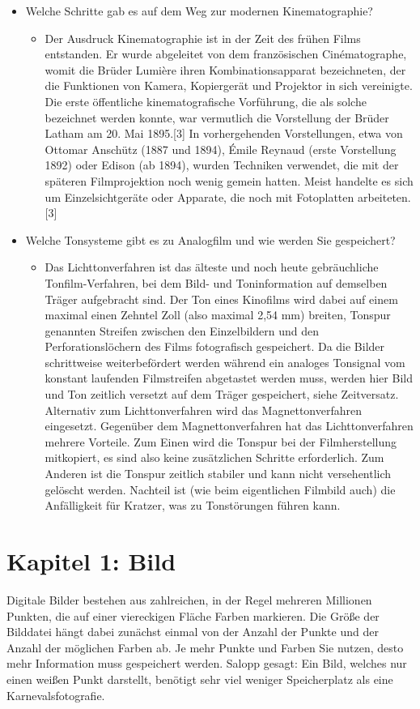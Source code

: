 \documentclass[11pt]{article}
\begin{document}
\begin{itemize}
\begin{itemize}
\end{itemize}
\item Welche Schritte gab es auf dem Weg zur modernen Kinematographie?
\begin{itemize}
\item Der Ausdruck Kinematographie ist in der Zeit des frühen Films entstanden. Er wurde abgeleitet von dem französischen Cinématographe, womit die Brüder Lumière ihren Kombinationsapparat bezeichneten, der die Funktionen von Kamera, Kopiergerät und Projektor in sich vereinigte. Die erste öffentliche kinematografische Vorführung, die als solche bezeichnet werden konnte, war vermutlich die Vorstellung der Brüder Latham am 20. Mai 1895.[3] In vorhergehenden Vorstellungen, etwa von Ottomar Anschütz (1887 und 1894), Émile Reynaud (erste Vorstellung 1892) oder Edison (ab 1894), wurden Techniken verwendet, die mit der späteren Filmprojektion noch wenig gemein hatten. Meist handelte es sich um Einzelsichtgeräte oder Apparate, die noch mit Fotoplatten arbeiteten.[3]
\end{itemize}
\item Welche Tonsysteme gibt es zu Analogfilm und wie werden Sie gespeichert?
\begin{itemize}
\item Das Lichttonverfahren ist das älteste und noch heute gebräuchliche Tonfilm-Verfahren, bei dem Bild- und Toninformation auf demselben Träger aufgebracht sind. Der Ton eines Kinofilms wird dabei auf einem maximal einen Zehntel Zoll (also maximal 2,54 mm) breiten, Tonspur genannten Streifen zwischen den Einzelbildern und den Perforationslöchern des Films fotografisch gespeichert. Da die Bilder schrittweise weiterbefördert werden während ein analoges Tonsignal vom konstant laufenden Filmstreifen abgetastet werden muss, werden hier Bild und Ton zeitlich versetzt auf dem Träger gespeichert, siehe Zeitversatz. Alternativ zum Lichttonverfahren wird das Magnettonverfahren eingesetzt. Gegenüber dem Magnettonverfahren hat das Lichttonverfahren mehrere Vorteile. Zum Einen wird die Tonspur bei der Filmherstellung mitkopiert, es sind also keine zusätzlichen Schritte erforderlich. Zum Anderen ist die Tonspur zeitlich stabiler und kann nicht versehentlich gelöscht werden. Nachteil ist (wie beim eigentlichen Filmbild auch) die Anfälligkeit für Kratzer, was zu Tonstörungen führen kann.
\end{itemize}
\end{itemize}
\section{Kapitel 1: Bild}
\label{sec:org82ae9ff}
Digitale Bilder bestehen aus zahlreichen, in der Regel mehreren Millionen Punkten, die auf einer viereckigen Fläche Farben markieren. Die Größe der Bilddatei hängt dabei zunächst einmal von der Anzahl der Punkte und der Anzahl der möglichen Farben ab. Je mehr Punkte und Farben Sie nutzen, desto mehr Information muss gespeichert werden. Salopp gesagt: Ein Bild, welches nur einen weißen Punkt darstellt, benötigt sehr viel weniger Speicherplatz als eine Karnevalsfotografie.
\end{document}
